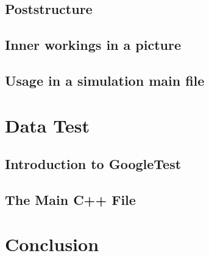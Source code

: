 \section{Poststructure}

\section{Inner workings in a picture}

\section{Usage in a simulation main file}


\chapter{Data Test}

\section{Introduction to GoogleTest}

\section{The Main C++ File}


\chapter{Conclusion}

